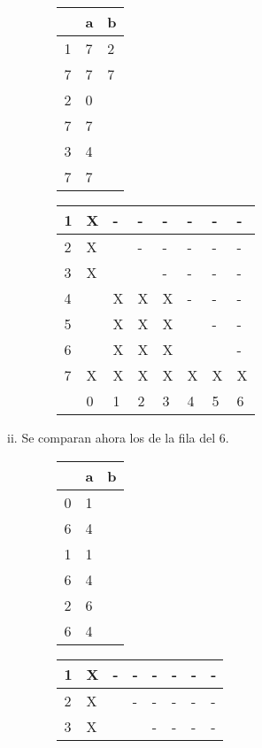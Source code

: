 \documentclass[11pt,a4paper]{article}
\begin{document}
\begin{enumerate}[a)]
\begin{enumerate}[I.]
\begin{enumerate}[i.]
\begin{figure}[H]
\begin{tabular}{l|ll}
					  & a & b \\ \hline
					1 & 7 & 2 \\
					7 & 7 & 7 \\ \hline
					2 & 0 &   \\
					7 & 7 &   \\ \hline
					3 & 4 &   \\
					7 & 7 & 
					\end{tabular}
				\end{figure}
				\begin{figure}[H]
				\centering
					\begin{tabular}{|l|l|l|l|l|l|l|l|}
					\hline
					1 & X & - & - & - & - & - & - \\ \hline
					2 & X &   & - & - & - & - & - \\ \hline
					3 & X &   &   & - & - & - & - \\ \hline
					4 &   & X & X & X & - & - & - \\ \hline
					5 &	  & X & X & X &   & - & - \\ \hline
					6 &   & X & X & X &   &   & - \\ \hline
					7 & X & X & X & X & X & X & X \\ \hline
			  		  & 0 & 1 & 2 & 3 & 4 & 5 & 6 \\ \hline
					\end{tabular}
				\end{figure}
				\item Se comparan ahora los de la fila del $6$.
				\begin{figure}[H]
				\centering
					\begin{tabular}{l|ll}
					  & a & b \\ \hline
					0 & 1 &   \\
					6 & 4 &   \\ \hline
					1 & 1 &   \\
					6 & 4 &   \\ \hline
					2 & 6 &   \\
					6 & 4 & 
					\end{tabular}
				\end{figure}
				\begin{figure}[H]
				\centering
					\begin{tabular}{|l|l|l|l|l|l|l|l|}
					\hline
					1 & X & - & - & - & - & - & - \\ \hline
					2 & X &   & - & - & - & - & - \\ \hline
					3 & X &   &   & - & - & - & - \\ \hline

\end{tabular}
\end{figure}
\end{enumerate}
\end{enumerate}
\end{enumerate}
\end{document}
